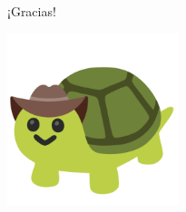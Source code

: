 \documentclass[
	11pt, %
]{beamer}
\begin{document}
\begin{frame}[plain] %
	\begin{center}
		\vspace{15mm}
		{\Huge ¡Gracias!}
		
		
        \includegraphics[width=5cm]{tortuga.png}
	\end{center}
\end{frame}

\end{document}

